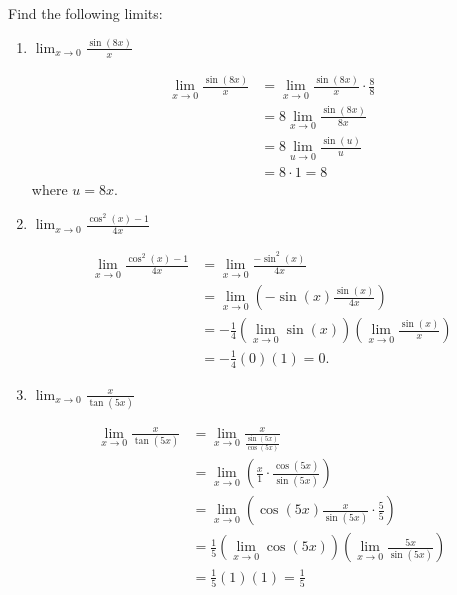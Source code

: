 \documentclass[handout,nooutcomes]{ximera}
\begin{document}
\begin{problem}
Find the following limits:

	\begin{enumerate}
	
	\item  $\lim_{x \to 0} \frac{\sin(8x)}{x}$
			\begin{freeResponse}
			\begin{align*}
			\lim_{x \to 0} \frac{\sin(8x)}{x} &= \lim_{x \to 0} \frac{\sin(8x)}{x} \cdot \frac{8}{8}  \\
			&= 8 \lim_{x \to 0} \frac{\sin(8x)}{8x}  \\
			&= 8 \lim_{u \to 0} \frac{\sin(u)}{u}  \\
			&= 8 \cdot 1 = 8
			\end{align*}
			where $u = 8x$.  
			\end{freeResponse}
			
			
			
	\item  $\lim_{x \to 0} \frac{\cos^2(x) - 1}{4x}$
			\begin{freeResponse}
			\begin{align*}
			\lim_{x \to 0} \frac{\cos^2(x) - 1}{4x} &= \lim_{x \to 0} \frac{- \sin^2(x)}{4x}  \\
			&= \lim_{x \to 0} \left(- \sin(x) \frac{\sin(x)}{4x} \right)  \\
			&= - \frac{1}{4} \left( \lim_{x \to 0} \sin(x) \right) \left( \lim_{x \to 0} \frac{\sin(x)}{x} \right)  \\
			&= - \frac{1}{4} (0) (1) = 0.
			\end{align*}
			\end{freeResponse}
			
			
			
	\item  $\lim_{x \to 0} \frac{x}{\tan(5x)}$
			\begin{freeResponse}
			\begin{align*}
			\lim_{x \to 0} \frac{x}{\tan(5x)} &= \lim_{x \to 0} \frac{x}{\frac{\sin(5x)}{\cos(5x)}}  \\
			&= \lim_{x \to 0} \left( \frac{x}{1} \cdot \frac{\cos(5x)}{\sin(5x)} \right)  \\
			&= \lim_{x \to 0} \left( \cos(5x) \frac{x}{\sin(5x)} \cdot \frac{5}{5} \right)  \\
			&= \frac{1}{5} \left( \lim_{x \to 0} \cos(5x) \right) \left( \lim_{x \to 0} \frac{5x}{\sin(5x)} \right)  \\
			&= \frac{1}{5} (1) (1) = \frac{1}{5}
			\end{align*}
			\end{freeResponse}
			
			
			
	\end{enumerate}
\end{problem}
	
\end{document}
